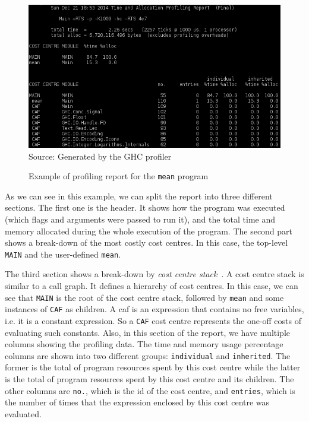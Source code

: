 \begin{figure}[htp]
  \centering
  \caption{Example of profiling report for the \texttt{mean} program}
  \includegraphics[width=\columnwidth]{images/profiler-placeholder}
  \footnotesize{Source: Generated by the GHC profiler}
  \label{fig:profiler-sample}
\end{figure}

As we can see in this example, we can split the report into three different sections. The first one is the header. It shows how the program was executed (which flags and arguments were passed to run it), and the total time and memory allocated during the whole execution of the program. The second part shows a break-down of the most costly cost centres. In this case, the top-level \texttt{MAIN} and the user-defined \texttt{mean}.

The third section shows a break-down by \emph{cost centre stack}~\cite{morgan:1998}. A cost centre stack is similar to a call graph. It defines a hierarchy of cost centres. In this case, we can see that \texttt{MAIN} is the root of the cost centre stack, followed by \texttt{mean} and some instances of \texttt{CAF} as children. A \ac{caf} is an expression that contains no free variables, i.e. it is a constant expression. So a \texttt{CAF} cost centre represents the one-off costs of evaluating such constants. Also, in this section of the report, we have multiple columns showing the profiling data. The time and memory usage percentage columns are shown into two different groups: \texttt{individual} and \texttt{inherited}. The former is the total of program resources spent by this cost centre while the latter is the total of program resources spent by this cost centre and its children. The other columns are \texttt{no.}, which is the id of the cost centre, and \texttt{entries}, which is the number of times that the expression enclosed by this cost centre was evaluated.

